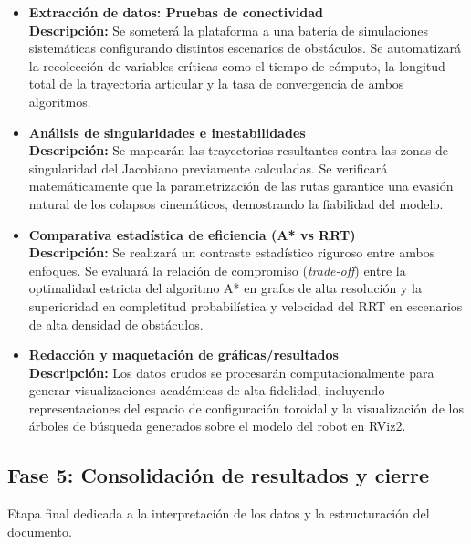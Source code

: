 \begin{itemize}
    \item \textbf{Extracción de datos: Pruebas de conectividad} \\
    \textbf{Descripción:} Se someterá la plataforma a una batería de simulaciones sistemáticas configurando distintos escenarios de obstáculos. Se automatizará la recolección de variables críticas como el tiempo de cómputo, la longitud total de la trayectoria articular y la tasa de convergencia de ambos algoritmos.

    \item \textbf{Análisis de singularidades e inestabilidades} \\
    \textbf{Descripción:} Se mapearán las trayectorias resultantes contra las zonas de singularidad del Jacobiano previamente calculadas. Se verificará matemáticamente que la parametrización de las rutas garantice una evasión natural de los colapsos cinemáticos, demostrando la fiabilidad del modelo.

    \item \textbf{Comparativa estadística de eficiencia (A* vs RRT)} \\
    \textbf{Descripción:} Se realizará un contraste estadístico riguroso entre ambos enfoques. Se evaluará la relación de compromiso (\textit{trade-off}) entre la optimalidad estricta del algoritmo A* en grafos de alta resolución y la superioridad en completitud probabilística y velocidad del RRT en escenarios de alta densidad de obstáculos.

    \item \textbf{Redacción y maquetación de gráficas/resultados} \\
    \textbf{Descripción:} Los datos crudos se procesarán computacionalmente para generar visualizaciones académicas de alta fidelidad, incluyendo representaciones del espacio de configuración toroidal y la visualización de los árboles de búsqueda generados sobre el modelo del robot en RViz2.
\end{itemize}

\subsection*{Fase 5: Consolidación de resultados y cierre}
Etapa final dedicada a la interpretación de los datos y la estructuración del documento.

